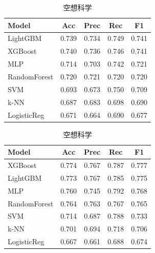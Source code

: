 \documentclass[uplatex, dvipdfmx, 11pt, a4paper, report]{jsbook}
\begin{document}
\begin{table}[H]
  \small
  \begin{minipage}[t]{0.49\textwidth}
    \centering
    \caption{宇宙}
    \begin{tabular}{l|c|c|c|c} \hline
      Model & Acc & Prec & Rec & F1 \\ \hline
      LightGBM & 0.739 & 0.734 & 0.749 & 0.741 \\
      XGBoost & 0.740 & 0.736 & 0.746 & 0.741 \\
      MLP & 0.714 & 0.703 & 0.742 & 0.721 \\
      RandomForest & 0.720 & 0.721 & 0.720 & 0.720 \\
      SVM & 0.693 & 0.673 & 0.750 & 0.709 \\
      k-NN & 0.687 & 0.683 & 0.698 & 0.690 \\
      LogisticReg & 0.671 & 0.664 & 0.690 & 0.677 \\ \hline
    \end{tabular}
  \end{minipage}
  \hfill
  \begin{minipage}[t]{0.49\textwidth}
    \centering
    \caption{空想科学}
    \begin{tabular}{l|c|c|c|c} \hline
      Model & Acc & Prec & Rec & F1 \\ \hline
      XGBoost & 0.774 & 0.767 & 0.787 & 0.777 \\
      LightGBM & 0.773 & 0.767 & 0.785 & 0.775 \\
      MLP & 0.760 & 0.745 & 0.792 & 0.768 \\
      RandomForest & 0.764 & 0.763 & 0.767 & 0.765 \\
      SVM & 0.714 & 0.687 & 0.788 & 0.733 \\
      k-NN & 0.701 & 0.694 & 0.718 & 0.706 \\
      LogisticReg & 0.667 & 0.661 & 0.688 & 0.674 \\ \hline
    \end{tabular}
  \end{minipage}
\end{table}
\end{document}
